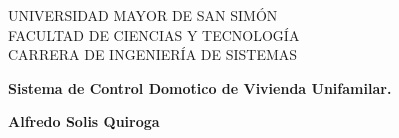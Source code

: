 

	\newcommand{\titulo}	{Sistema de Control Domotico de Vivienda Unifamilar}
	\newcommand{\alumnos}	{Alfredo Solis Quiroga  %
					 				}
	\newcommand{\profguia}	{Profesor guía: Lic. Carmen Rosa Garcia Perez}

	  	  \newcommand{\coguia} 	{Profesor Co-guía: Lic. Carmen Rosa Garcia Perez} 
			
	\newcommand{\mes} 	{Octubre}  %
	\newcommand{\yeaR} 	{2017} %
				
				
				
				
				
				
				
				
				
				
				
				
				
				
				
				
				
				
				
				
				


\begin{center}
{\renewcommand{\baselinestretch}{1}
\Large{UNIVERSIDAD MAYOR DE SAN SIMÓN}\\\Large{FACULTAD DE CIENCIAS Y TECNOLOGÍA\\CARRERA DE INGENIERÍA DE SISTEMAS}

}
\vspace{65mm}

\Large{\textbf{\titulo.}} 

\vspace{55mm}
\Large{\textbf{\alumnos}}

\vspace{30mm}

\end{center}
\vspace{10mm}

